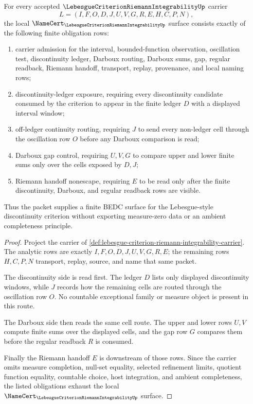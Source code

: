 \begin{theorem}
\label{thm:lebesgue-criterion-riemann-integrability-namecert-obligations}
For every accepted $\LebesgueCriterionRiemannIntegrabilityUp$ carrier
$$
L=(I,F,O,D,J,U,V,G,R,E,H,C,P,N),
$$
the local $\NameCert_{\LebesgueCriterionRiemannIntegrabilityUp}$ surface consists exactly of the following finite obligation rows:
\begin{enumerate}
\item carrier admission for the interval, bounded-function observation, oscillation test, discontinuity ledger, Darboux routing, Darboux sums, gap, regular readback, Riemann handoff, transport, replay, provenance, and local naming rows;
\item discontinuity-ledger exposure, requiring every discontinuity candidate consumed by the criterion to appear in the finite ledger $D$ with a displayed interval window;
\item off-ledger continuity routing, requiring $J$ to send every non-ledger cell through the oscillation row $O$ before any Darboux comparison is read;
\item Darboux gap control, requiring $U,V,G$ to compare upper and lower finite sums only over the cells exposed by $D,J$;
\item Riemann handoff nonescape, requiring $E$ to be read only after the finite discontinuity, Darboux, and regular readback rows are visible.
\end{enumerate}
Thus the packet supplies a finite BEDC surface for the Lebesgue-style discontinuity criterion without exporting measure-zero data or an ambient completeness principle.
\end{theorem}
\begin{proof}
Project the carrier of \autoref{def:lebesgue-criterion-riemann-integrability-carrier}. The analytic rows are exactly $I,F,O,D,J,U,V,G,R,E$; the remaining rows $H,C,P,N$ transport, replay, source, and name that same packet.

The discontinuity side is read first. The ledger $D$ lists only displayed discontinuity windows, while $J$ records how the remaining cells are routed through the oscillation row $O$. No countable exceptional family or measure object is present in this route.

The Darboux side then reads the same cell route. The upper and lower rows $U,V$ compute finite sums over the displayed cells, and the gap row $G$ compares them before the regular readback $R$ is consumed.

Finally the Riemann handoff $E$ is downstream of those rows. Since the carrier omits measure completion, null-set equality, selected refinement limits, quotient function equality, countable choice, host integration, and ambient completeness, the listed obligations exhaust the local $\NameCert_{\LebesgueCriterionRiemannIntegrabilityUp}$ surface.
\end{proof}

